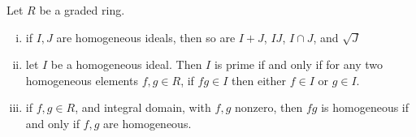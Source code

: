 \begin{prop}
Let $R$ be a graded ring.
\begin{enumerate}[(i)]
\item if $I, J$ are homogeneous ideals, then so are $I+J$, $IJ$, $I \cap J$, and $\sqrt{J}$
\item let $I$ be a homogeneous ideal. Then $I$ is prime if and only if for any two homogeneous elements $f,g \in R$, if $fg \in I$ then either $f \in I$ or $g \in I$. 
\item if $f,g \in R$, and integral domain, with $f,g$ nonzero, then $fg$ is homogeneous if and only if $f,g$ are homogeneous. 
\end{enumerate}
\end{prop}



























